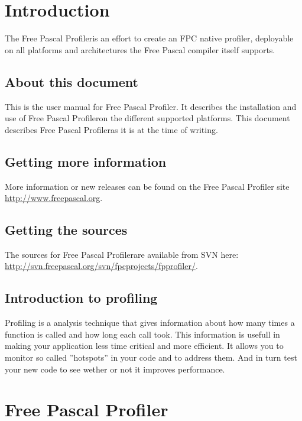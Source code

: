 \documentclass[twoside]{book}
\newcommand{\fpp}{Free Pascal Profiler}
\newcommand{\fpprofilerwebsite}{\url{http://www.freepascal.org}}
\begin{document}
\tableofcontents

\chapter{Introduction}
The \fpp is an effort to create an FPC native profiler, deployable on all platforms and
architectures the Free Pascal compiler itself supports.

\section{About this document}
This is the user manual for \fpp. It describes the
installation and use of \fpp on the different supported
platforms. This document describes \fpp as it is at the time
of writing.

\section{Getting more information}
More information or new releases can be found on the \fpp
site \fpprofilerwebsite.

\section{Getting the sources}
The sources for \fpp are available from SVN here: \url{http://svn.freepascal.org/svn/fpcprojects/fpprofiler/}.

\section{Introduction to profiling}
Profiling is a analysis technique that gives information about how many times a 
function is called and how long each call took. This information is usefull in 
making your application less time critical and more efficient.
It allows you to monitor so called ''hotspots'' in your code and to address them.
And in turn test your new code to see wether or not it improves performance.

\chapter{Free Pascal Profiler}
\end{document}
